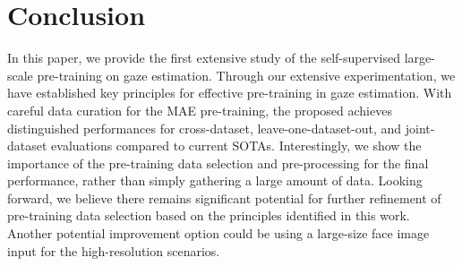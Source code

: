 \section{Conclusion}
\label{sec:conclusion}
In this paper, we provide the first extensive study of the self-supervised large-scale pre-training on gaze estimation. 
Through our extensive experimentation, we have established key principles for effective pre-training in gaze estimation.
With careful data curation for the MAE pre-training, the proposed \methodname achieves distinguished performances for cross-dataset, leave-one-dataset-out, and joint-dataset evaluations compared to current SOTAs.
Interestingly, we show the importance of the pre-training data selection and pre-processing for the final performance, rather than simply gathering a large amount of data.
Looking forward, we believe there remains significant potential for further refinement of pre-training data selection based on the principles identified in this work. 
Another potential improvement option could be using a large-size face image input for the high-resolution scenarios.


